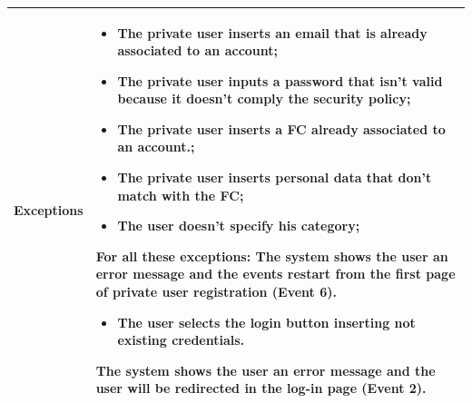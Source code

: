 \documentclass[titlepage]{article}
\begin{document}
\begin{longtable}{| p{3 cm} | p{10 cm} |}
\textbf{Exceptions} & 
\begin{itemize}
	\item The private user inserts an email that is already associated to an account;
	\item The private user inputs a password that isn't valid because it doesn't comply the security policy;
	\item The private user inserts a FC already associated to an account.;
	\item The private user inserts personal data that don't match with the FC;
	\item The user doesn't specify his category;
\end{itemize} 
							
For all these exceptions: The system shows the user an error message and the events restart from the first page of private user registration (Event 6).


\begin{itemize}
\item The user selects the login button inserting not existing credentials.
\end{itemize} 
The system shows the user an error message and the user will be redirected in the log-in page (Event 2).

\\ \hline
							

\end{longtable}

\newpage
\end{document}
